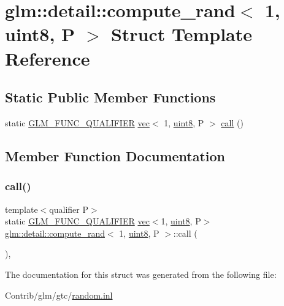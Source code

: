 \hypertarget{structglm_1_1detail_1_1compute__rand_3_011_00_01uint8_00_01_p_01_4}{}\section{glm\+:\+:detail\+:\+:compute\+\_\+rand$<$ 1, uint8, P $>$ Struct Template Reference}
\label{structglm_1_1detail_1_1compute__rand_3_011_00_01uint8_00_01_p_01_4}
\subsection*{Static Public Member Functions}
\begin{DoxyCompactItemize}
\item 
static \mbox{\hyperlink{setup_8hpp_a33fdea6f91c5f834105f7415e2a64407}{G\+L\+M\+\_\+\+F\+U\+N\+C\+\_\+\+Q\+U\+A\+L\+I\+F\+I\+ER}} \mbox{\hyperlink{structglm_1_1vec}{vec}}$<$ 1, \mbox{\hyperlink{namespaceglm_1_1detail_aef2588f97d090cc19fbbe0c74fe17c8f}{uint8}}, P $>$ \mbox{\hyperlink{structglm_1_1detail_1_1compute__rand_3_011_00_01uint8_00_01_p_01_4_a9391c8df40318095dabaf29789a665aa}{call}} ()
\end{DoxyCompactItemize}


\subsection{Member Function Documentation}
\mbox{\label{structglm_1_1detail_1_1compute__rand_3_011_00_01uint8_00_01_p_01_4_a9391c8df40318095dabaf29789a665aa}} 
\subsubsection{\texorpdfstring{call()}{call()}}
{\footnotesize\ttfamily template$<$qualifier P$>$ \\
static \mbox{\hyperlink{setup_8hpp_a33fdea6f91c5f834105f7415e2a64407}{G\+L\+M\+\_\+\+F\+U\+N\+C\+\_\+\+Q\+U\+A\+L\+I\+F\+I\+ER}} \mbox{\hyperlink{structglm_1_1vec}{vec}}$<$1, \mbox{\hyperlink{namespaceglm_1_1detail_aef2588f97d090cc19fbbe0c74fe17c8f}{uint8}}, P$>$ \mbox{\hyperlink{structglm_1_1detail_1_1compute__rand}{glm\+::detail\+::compute\+\_\+rand}}$<$ 1, \mbox{\hyperlink{namespaceglm_1_1detail_aef2588f97d090cc19fbbe0c74fe17c8f}{uint8}}, P $>$\+::call (\begin{DoxyParamCaption}{ }\end{DoxyParamCaption})\hspace{0.3cm}{\ttfamily [inline]}, {\ttfamily [static]}}



The documentation for this struct was generated from the following file\+:\begin{DoxyCompactItemize}
\item 
Contrib/glm/gtc/\mbox{\hyperlink{random_8inl}{random.\+inl}}\end{DoxyCompactItemize}
